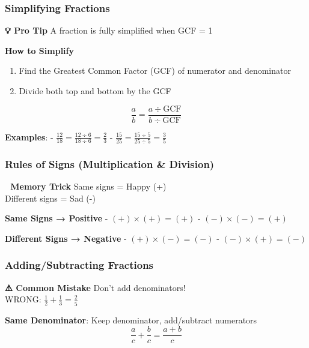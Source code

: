 \documentclass[
  letterpaper,
  DIV=11,
  numbers=noendperiod]{scrreprt}
\providecommand{\tightlist}{%
  \setlength{\itemsep}{0pt}\setlength{\parskip}{0pt}}
\theoremstyle{definition}
\theoremstyle{remark}
\begin{document}
\subsubsection*{Simplifying Fractions}\label{simplifying-fractions}

\textbf{💡 Pro Tip} A fraction is fully simplified when GCF = 1

\textbf{How to Simplify}

\begin{enumerate}
\def\labelenumi{\arabic{enumi}.}
\tightlist
\item
  Find the Greatest Common Factor (GCF) of numerator and denominator
\item
  Divide both top and bottom by the GCF
\end{enumerate}

\[\frac{a}{b} = \frac{a \div \text{GCF}}{b \div \text{GCF}}\]

\textbf{Examples}: -
\(\frac{12}{18} = \frac{12 \div 6}{18 \div 6} = \frac{2}{3}\) -
\(\frac{15}{25} = \frac{15 \div 5}{25 \div 5} = \frac{3}{5}\)

\subsubsection*{Rules of Signs (Multiplication \&
Division)}\label{rules-of-signs-multiplication-division}

\textbf{🎯 Memory Trick} Same signs = Happy (+)\\
Different signs = Sad (-)

\textbf{Same Signs → Positive} - \((+) \times (+) = (+)\) -
\((-) \times (-) = (+)\)

\textbf{Different Signs → Negative} - \((+) \times (-) = (-)\) -
\((-) \times (+) = (-)\)

\subsubsection*{Adding/Subtracting
Fractions}\label{addingsubtracting-fractions}

\textbf{⚠️ Common Mistake} Don't add denominators!\\
WRONG: \(\frac{1}{2} + \frac{1}{3} = \frac{2}{5}\)

\textbf{Same Denominator}: Keep denominator, add/subtract numerators
\[\frac{a}{c} + \frac{b}{c} = \frac{a + b}{c}\]
\end{document}
